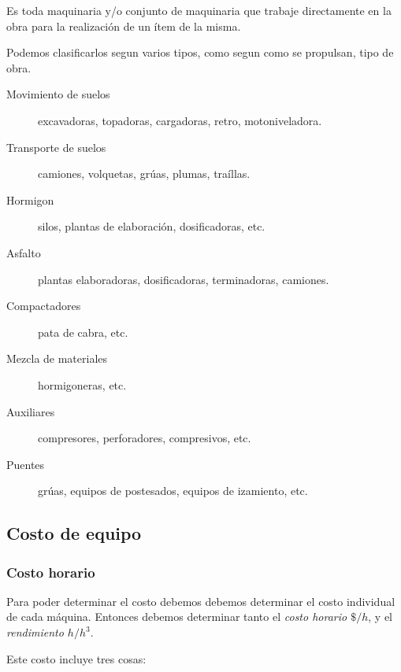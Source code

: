 \documentclass[../main.tex]{subfiles}
\begin{document}
Es toda maquinaria y/o conjunto de maquinaria que trabaje directamente en la
obra para la realización de un ítem de la misma.

Podemos clasificarlos segun varios tipos, como segun como se propulsan, tipo de
obra. 

\begin{description}
  \item[Movimiento de suelos] excavadoras, topadoras, cargadoras, retro, motoniveladora.
  \item[Transporte de suelos] camiones, volquetas, grúas, plumas, traíllas.
  \item[Hormigon] silos, plantas de elaboración, dosificadoras, etc.
  \item[Asfalto] plantas elaboradoras, dosificadoras, terminadoras, camiones.
  \item[Compactadores] pata de cabra, etc.
  \item[Mezcla de materiales] hormigoneras, etc.
  \item[Auxiliares] compresores, perforadores, compresivos, etc.
  \item[Puentes] grúas, equipos de postesados, equipos de izamiento, etc.
\end{description}

\subsection{Costo de equipo}

\subsubsection{Costo horario}

Para poder determinar el costo debemos debemos determinar el costo individual de
cada máquina. Entonces debemos determinar tanto el \textit{costo horario $\$/h$},
y el \textit{rendimiento $h/ h^3$}. 

Este costo incluye tres cosas:
\end{document}
